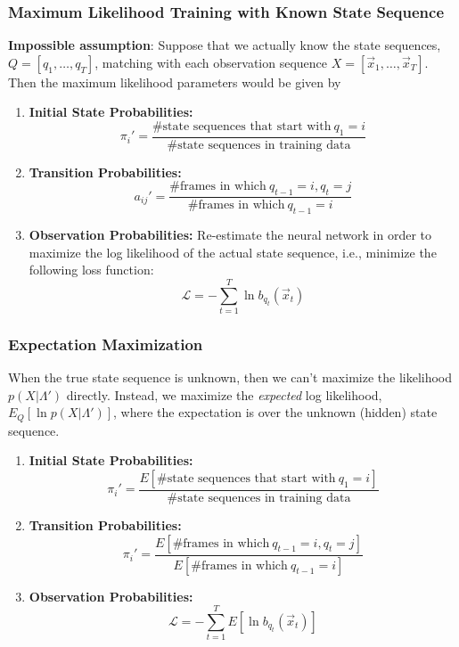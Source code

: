 \documentclass{beamer}
\begin{document}
\begin{frame}
  \frametitle{Maximum Likelihood Training with Known State Sequence}

  {\bf Impossible assumption}: Suppose that we actually know the state sequences,
  $Q=[q_1,\ldots,q_T]$, matching with each observation sequence
  $X=[\vec{x}_1,\ldots,\vec{x}_T]$.  Then the maximum likelihood
  parameters would be given by
  \begin{enumerate}
  \item {\bf Initial State Probabilities:}
    \[
    \pi_i'=\frac{\mbox{\# state sequences that start with}~q_1=i}{\mbox{\# state sequences in training data}}
    \]
  \item {\bf Transition Probabilities:}
    \[
    a_{ij}'=\frac{\mbox{\# frames in which}~q_{t-1}=i,q_t=j}{\mbox{\# frames in which}~q_{t-1}=i}
    \]
  \item {\bf Observation Probabilities:} Re-estimate the neural
    network in order to maximize the log likelihood of the actual
    state sequence, i.e., minimize the following loss function:
    \[
    {\mathcal L}= -\sum_{t=1}^T \ln b_{q_t}(\vec{x}_t)
    \]
  \end{enumerate}
\end{frame}
  
\begin{frame}
  \frametitle{Expectation Maximization}

  When the true state sequence is unknown, then we can't maximize the
  likelihood $p(X|\Lambda')$ directly.  Instead, we maximize the {\em
    expected} log likelihood, $E_Q\left[\ln p(X|\Lambda')\right]$,
  where the expectation is over the unknown (hidden) state sequence.
  \begin{enumerate}
  \item {\bf Initial State Probabilities:}
    \[
    \pi_i'=\frac{E\left[\mbox{\# state sequences that start with}~q_1=i\right]}{\mbox{\# state sequences in training data}}
    \]
  \item {\bf Transition Probabilities:}
    \[
    \pi_i'=\frac{E\left[\mbox{\# frames in which}~q_{t-1}=i,q_t=j\right]}{E\left[\mbox{\# frames in which}~q_{t-1}=i\right]}
    \]
  \item {\bf Observation Probabilities:} 
    \[
    {\mathcal L}= -\sum_{t=1}^T E\left[\ln b_{q_t}(\vec{x}_t)\right]
    \]
  \end{enumerate}
\end{frame}
\end{document}
